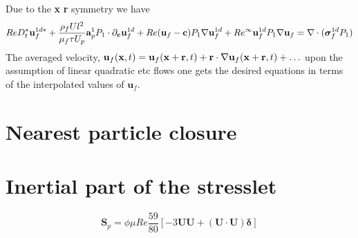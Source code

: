 \documentclass[11pt]{My_preprint}
\begin{document}
Due to the \textbf{x} \textbf{r} symmetry we have 
\begin{align*}
    Re D_t^*  \textbf{u}_f^{1d*}  
    +  \frac{\rho_f U l^2 }{\mu_f \tau U_p}  \textbf{a}_p^1  P_1   \cdot \partial_\textbf{c} \textbf{u}_f^{1d} 
    + Re ( \textbf{u}_f -   \textbf{c}  ) P_1 \mathbf{\nabla} \textbf{u}_f^{1d}
    + Re^\infty \textbf{u}_f^{1d} P_1 \mathbf{\nabla}\textbf{u}_f
    = 
    \mathbf{\nabla}\cdot ( \bm\sigma_f^{1d} P_1)
\end{align*}
The averaged velocity, 
$\textbf{u}_f(\textbf{x},t) = \textbf{u}_f(\textbf{x}+ \textbf{r},t) + \textbf{r}\cdot \mathbf{\nabla} \textbf{u}_f(\textbf{x}+ \textbf{r},t)+ \ldots$ upon the assumption of linear quadratic etc flows one gets the desired equations in terms of the interpolated values of $\textbf{u}_f$. 

\section{Nearest particle closure}


\section*{Inertial part of the stresslet }

\begin{equation*}
    \textbf{S}_p 
    =
    \phi \mu Re
    \frac{59}{80} \left[
        - 3\textbf{U}\textbf{U}
        + (\textbf{U}\cdot\textbf{U})\bm\delta
    \right] 
\end{equation*}


\appendix
\end{document}
